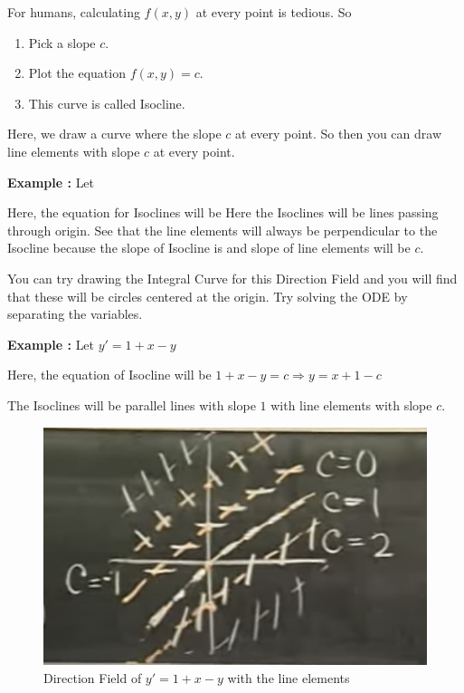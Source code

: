 For humans, calculating $f(x, y)$ at every point is tedious.
So
\begin{enumerate}
	\item Pick a slope $c$.
	\item Plot the equation $f(x, y) = c$.
	\item This curve is called Isocline.
\end{enumerate}

Here, we draw a curve where the slope $c$ at every point.
So then you can draw line elements with slope $c$ at every point.


{\bf Example : } Let 

Here, the equation for Isoclines will be 
Here the Isoclines will be lines passing through origin.
See that the line elements will always be perpendicular to the Isocline because the slope of Isocline is  and slope of line elements will be $c$.

You can try drawing the Integral Curve for this Direction Field and you will find that these will be circles centered at the origin.
Try solving the ODE by separating the variables.

{\bf Example : } Let $y' = 1 + x - y$

Here, the equation of Isocline will be $1 + x - y = c \Rightarrow y = x + 1 - c$

The Isoclines will be parallel lines with slope $1$ with line elements with slope $c$.

\begin{figure}[ht!]
	\centering
	\includegraphics[scale=0.3]{./images/lecture_1_figure_2.png}
	\caption{Direction Field of $y' = 1 + x - y$ with the line elements}
\end{figure}

